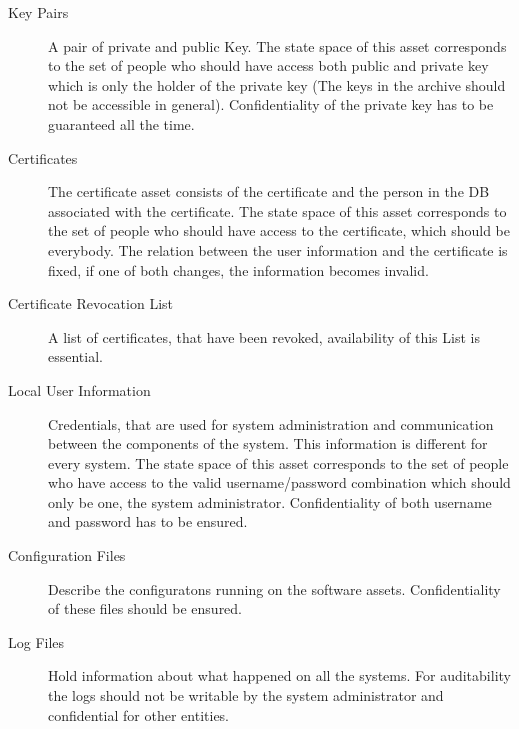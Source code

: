 \documentclass{article}
\begin{document}
\begin{description}
\begin{description}
\item[Key Pairs] A pair of private and public Key. The state space of this asset corresponds to the set of people who should have access both public and private key which is only the holder of the private key (The keys in the archive should not be accessible in general). Confidentiality of the private key has to be guaranteed all the time.

\item[Certificates] The certificate asset consists of the certificate and the person in the DB associated with the certificate. The state space of this asset corresponds to the set of people who should have access to the certificate, which should be everybody. The relation between the user information and the certificate is fixed, if one of both changes, the information becomes invalid.

\item[Certificate Revocation List] A list of certificates, that have been revoked, availability of this List is essential.

\item[Local User Information] Credentials, that are used for system administration and communication between the components of the system. This information is different for every system. The state space of this asset corresponds to the set of people who have access to the valid username/password combination which should only be one, the system administrator. Confidentiality of both username and password has to be ensured.

\item[Configuration Files] Describe the configuratons running on the software assets. Confidentiality of these files should be ensured.

\item[Log Files] Hold information about what happened on all the systems. For auditability the logs should not be writable by the system administrator and confidential for other entities.

\end{description}

\end{description}
\end{document}
